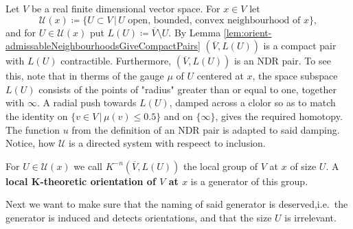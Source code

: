\begin{definition}
    Let $V$ be a real finite dimensional vector space. For $x\in V$ let
    \begin{equation*}
        \mathcal{U}(x)\coloneq \{U\subset V \,|\, U \text{ open, bounded, convex neighbourhood of }x \},
    \end{equation*}
    and for $U\in \mathcal{U}(x)$ put $L(U)\coloneq \overline{V}\setminus U$. By Lemma \ref{lem:orient-admissableNeighbourhoodsGiveCompactPairs} $(\overline{V},L(U))$ is a compact pair with $L(U)$ contractible. Furthermore, $(\overline{V},L(U))$ is an NDR pair. To see this, note that in therms of the gauge $\mu$ of $U$ centered at $x$, the space subspace $L(U)$ consists of the points of "radius" greater than or equal to one, together with $\infty$. A radial push towards $L(U)$, damped across a clolor so as to match the identity on $\{v\in V\,|\, \mu(v)\leq 0.5 \}$ and on $\{\infty\}$, gives the required homotopy. The function $u$ from the definition of an NDR pair is adapted to said damping. Notice, how $\mathcal{U}$ is a directed system with respeect to inclusion.
\end{definition}
\begin{definition} \label{def:orient-localKtheoreticOrientation}
        For $U\in \mathcal{U}(x)$ we call  $K^{-n}(\overline{V},L(U))$ the local group of $V$ at $x$ of size $U$. A \textbf{local K-theoretic orientation of $V$ at $x$} is a generator of this group.
\end{definition}
Next we want to make sure that the naming of said generator is deserved,i.e.\ the generator is induced and detects orientations, and that the size $U$ is irrelevant.

